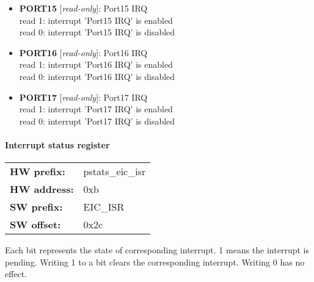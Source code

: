 \begin{itemize}
\begin{small}
\\
read 1: interrupt 'Port14 IRQ' is enabled\\read 0: interrupt 'Port14 IRQ' is disabled
\end{small}
\item \begin{small}
{\bf 
PORT15
} [\emph{read-only}]: Port15 IRQ
\\
read 1: interrupt 'Port15 IRQ' is enabled\\read 0: interrupt 'Port15 IRQ' is disabled
\end{small}
\item \begin{small}
{\bf 
PORT16
} [\emph{read-only}]: Port16 IRQ
\\
read 1: interrupt 'Port16 IRQ' is enabled\\read 0: interrupt 'Port16 IRQ' is disabled
\end{small}
\item \begin{small}
{\bf 
PORT17
} [\emph{read-only}]: Port17 IRQ
\\
read 1: interrupt 'Port17 IRQ' is enabled\\read 0: interrupt 'Port17 IRQ' is disabled
\end{small}
\end{itemize}
\paragraph*{Interrupt status register}\vspace{12pt}

\begin{tabular}{l l }
{\bf HW prefix:}  & pstats\_eic\_isr\\
{\bf HW address:}  & 0xb\\
{\bf SW prefix:}  & EIC\_ISR\\
{\bf SW offset:}  & 0x2c\\
\end{tabular}

\vspace{12pt}
Each bit represents the state of corresponding interrupt. 1 means the interrupt is pending. Writing 1 to a bit clears the corresponding interrupt. Writing 0 has no effect.

